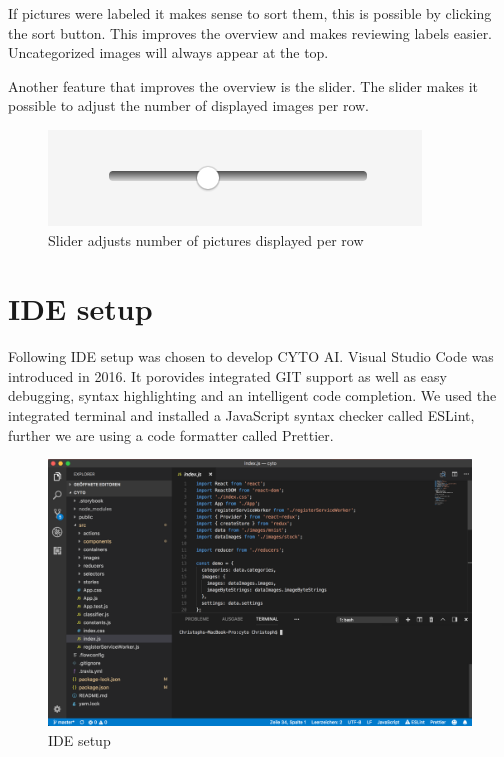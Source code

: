 If pictures were labeled it makes sense to sort them, this
is possible by clicking the sort button. This improves the
overview and makes reviewing labels easier. Uncategorized
images will always appear at the top.
 
Another feature that improves the overview is the slider. The slider makes it possible to adjust the number of displayed images per row. 

\begin{figure}[H]
	\centering
	\includegraphics[scale=0.8]{bilder/cyto/Slider.png}
	\caption{Slider adjusts number of pictures displayed per row}
	\label{fig:Slider}
\end{figure}

\section{IDE setup}
Following IDE setup was chosen to develop CYTO AI.
Visual Studio Code was introduced in 2016. It porovides integrated GIT support as well as easy debugging, syntax highlighting and an intelligent code completion.
We used the integrated terminal and installed a JavaScript syntax checker called ESLint, further we are using a code formatter called Prettier. 

\begin{figure}[H]
	\centering
	\includegraphics[width=\linewidth]{bilder/cyto/IDE.png}
	\caption{IDE setup}
	\label{fig:IDE}
\end{figure}

